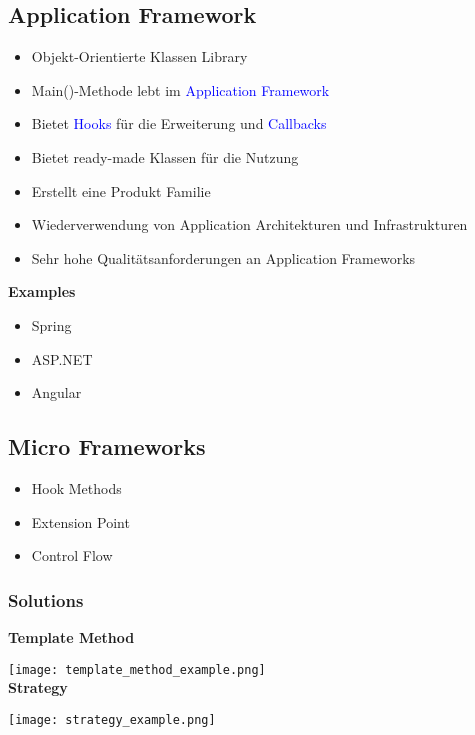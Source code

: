 \subsection{Application Framework}
\begin{itemize}
    \item Objekt-Orientierte Klassen Library
    \item Main()-Methode lebt im \textcolor{blue}{Application Framework}
    \item Bietet \textcolor{blue}{Hooks} für die Erweiterung und \textcolor{blue}{Callbacks}
    \item Bietet ready-made Klassen für die Nutzung
    \item Erstellt eine Produkt Familie
    \item Wiederverwendung von Application Architekturen und Infrastrukturen
    \item Sehr hohe Qualitätsanforderungen an Application Frameworks
\end{itemize}
\vspace{10pt}
\textbf{Examples}
\begin{itemize}
    \item Spring
    \item ASP.NET
    \item Angular
\end{itemize}





\subsection{Micro Frameworks}

\begin{itemize}
    \item Hook Methods
    \item Extension Point
    \item Control Flow
\end{itemize}

\subsubsection{Solutions}

\textbf{Template Method}

\texttt{[image: template\_method\_example.png]} \\

\textbf{Strategy}

\texttt{[image: strategy\_example.png]} \\

